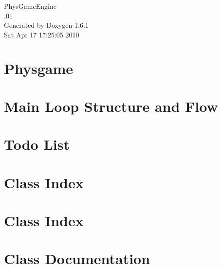 \documentclass[a4paper]{book}
\begin{document}
\hypersetup{pageanchor=false}
\begin{titlepage}
\vspace*{7cm}
\begin{center}
{\Large PhysGameEngine \\[1ex]\large .01 }\\
\vspace*{1cm}
{\large Generated by Doxygen 1.6.1}\\
\vspace*{0.5cm}
{\small Sat Apr 17 17:25:05 2010}\\
\end{center}
\end{titlepage}
\clearemptydoublepage
{}
\tableofcontents
\clearemptydoublepage
{}
\hypersetup{pageanchor=true}
\chapter{Physgame}
\label{index}\hypertarget{index}{}
\chapter{Main Loop Structure and Flow}
\label{mainloop1}
\hypertarget{mainloop1}{}

\chapter{Todo List}
\label{todo}
\hypertarget{todo}{}

\chapter{Class Index}

\chapter{Class Index}

\chapter{Class Documentation}















\printindex
\end{document}
